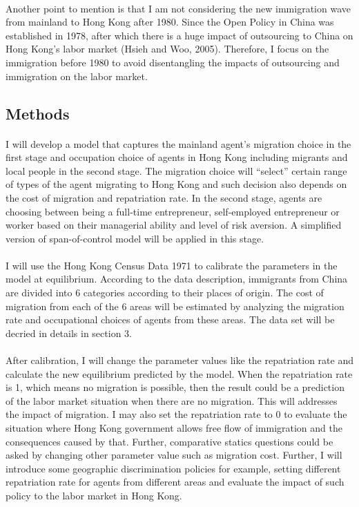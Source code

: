 \documentclass[12pt]{article}
\begin{document}
\paragraph{}
Another point to mention is that I am not considering the new immigration wave from mainland to Hong Kong after 1980. Since the Open Policy in China was established in 1978, after which there is a huge impact of outsourcing to China on Hong Kong's labor market (Hsieh and Woo, 2005). Therefore, I focus on the immigration before 1980 to avoid disentangling the impacts of outsourcing and immigration on the labor market. 



\subsection{Methods}
\paragraph{}
I will develop a model that captures the mainland agent's migration choice in the first stage and occupation choice of agents in Hong Kong including migrants and local people in the second stage. The migration choice will "`select"' certain range of types of the agent migrating to Hong Kong and such decision also depends on the cost of migration and repatriation rate. In the second stage, agents are choosing between being a full-time entrepreneur, self-employed entrepreneur or worker based on their managerial ability and level of risk aversion. A simplified version of span-of-control model will be applied in this stage. 
\paragraph{}
I will use the Hong Kong Census Data 1971 to calibrate the parameters in the model at equilibrium.  According to the data description, immigrants from China are divided into 6 categories according to their places of origin. The cost of migration from each of the 6 areas will be estimated by analyzing the migration rate and occupational choices of agents from these areas. The data set will be decried in details in section 3. 
\paragraph{}
After calibration, I will change the parameter values like the repatriation rate and calculate the new equilibrium predicted by the model. When the repatriation rate is 1, which means no migration is possible, then the result could be a prediction of the labor market situation when there are no migration. This will addresses the impact of migration. I may also set the repatriation rate to 0 to evaluate the situation where Hong Kong government allows free flow of immigration and the consequences caused by that. Further, comparative statics questions could be asked by changing other parameter value such as migration cost. Further, I will introduce some geographic discrimination policies for example, setting different repatriation rate for agents from different areas and evaluate the impact of such policy to the labor market in Hong Kong. 
\end{document}
